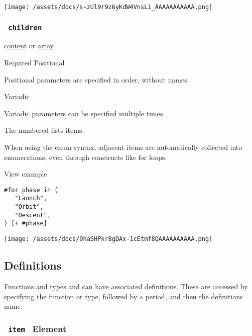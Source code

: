 \texttt{[image: /assets/docs/s-zUl9r9z6yKdW4VnsLi\_AAAAAAAAAAA.png]}

\subsubsection{\texorpdfstring{\texttt{\ children\ }}{ children }}\label{parameters-children}

\href{/docs/reference/foundations/content/}{content} {or}
\href{/docs/reference/foundations/array/}{array}

{Required} {{ Positional }}

\label{parameters-children-positional-tooltip}
Positional parameters are specified in order, without names.

{{ Variadic }}

\label{parameters-children-variadic-tooltip}
Variadic parameters can be specified multiple times.

The numbered list\textquotesingle s items.

When using the enum syntax, adjacent items are automatically collected
into enumerations, even through constructs like for loops.


View example

\begin{verbatim}
#for phase in (
   "Launch",
   "Orbit",
   "Descent",
) [+ #phase]
\end{verbatim}

\texttt{[image: /assets/docs/9haSHPkr8gDAx-1cEtmf8QAAAAAAAAAA.png]}

\subsection{\texorpdfstring{{ Definitions
}}{ Definitions }}\label{definitions}

\label{definitions-tooltip}
Functions and types and can have associated definitions. These are
accessed by specifying the function or type, followed by a period, and
then the definition\textquotesingle s name.

\subsubsection{\texorpdfstring{\texttt{\ item\ } {{ Element
}}}{ item   Element }}\label{definitions-item}

